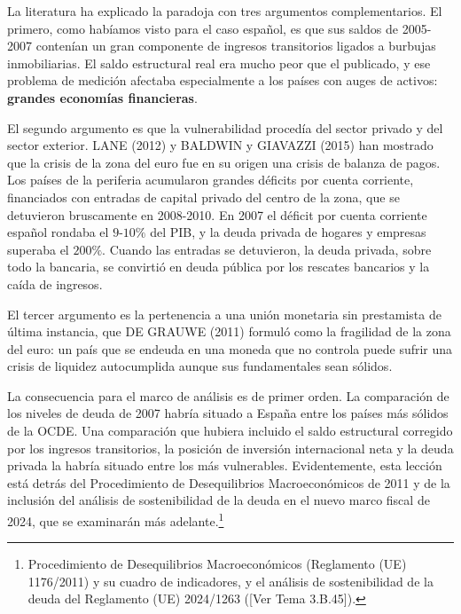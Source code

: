 \documentclass[10pt,a4paper]{article}
\newcommand{\authorfont}[1]{{\fontfamily{EBGaramond-TLF}\selectfont #1}}
\begin{document}
La literatura ha explicado la paradoja con tres argumentos complementarios. El primero, como habíamos visto para el caso español, es que sus saldos de 2005-2007 contenían un gran componente de ingresos transitorios ligados a burbujas inmobiliarias. El saldo estructural real era mucho peor que el publicado, y ese problema de medición afectaba especialmente a los países con auges de activos: \textbf{grandes economías financieras}.

El segundo argumento es que la vulnerabilidad procedía del sector privado y del sector exterior. LANE (2012) y BALDWIN y GIAVAZZI (2015) han mostrado que la crisis de la zona del euro fue en su origen una crisis de balanza de pagos. Los países de la periferia acumularon grandes déficits por cuenta corriente, financiados con entradas de capital privado del centro de la zona, que se detuvieron bruscamente en 2008-2010. En 2007 el déficit por cuenta corriente español rondaba el $9$-$10\%$ del PIB, y la deuda privada de hogares y empresas superaba el $200\%$. Cuando las entradas se detuvieron, la deuda privada, sobre todo la bancaria, se convirtió en deuda pública por los rescates bancarios y la caída de ingresos.

El tercer argumento es la pertenencia a una unión monetaria sin prestamista de última instancia, que DE GRAUWE (2011) formuló como la fragilidad de la zona del euro: un país que se endeuda en una moneda que no controla puede sufrir una crisis de liquidez autocumplida aunque sus fundamentales sean sólidos.

La consecuencia para el marco de análisis es de primer orden. La comparación de los niveles de deuda de 2007 habría situado a España entre los países más sólidos de la OCDE. Una comparación que hubiera incluido el saldo estructural corregido por los ingresos transitorios, la posición de inversión internacional neta y la deuda privada la habría situado entre los más vulnerables. Evidentemente, esta lección está detrás del Procedimiento de Desequilibrios Macroeconómicos de 2011 y de la inclusión del análisis de sostenibilidad de la deuda en el nuevo marco fiscal de 2024, que se examinarán más adelante.\footnote{Procedimiento de Desequilibrios Macroeconómicos (Reglamento (UE) 1176/2011) y su cuadro de indicadores, y el análisis de sostenibilidad de la deuda del Reglamento (UE) 2024/1263 ([\authorfont{Ver Tema 3.B.45}]).
}
\end{document}
